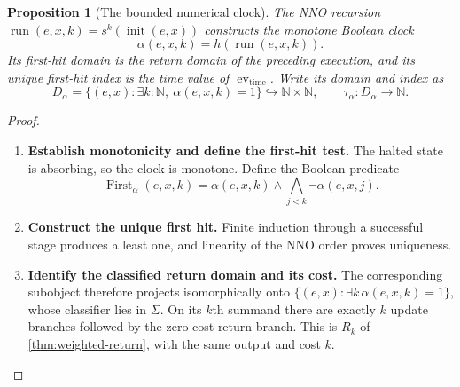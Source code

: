 \documentclass[11pt,a4paper]{article}
\numberwithin{algorithm}{section}
\numberwithin{equation}{section}
\newtheorem{proposition}[proposition]{Proposition}
\theoremstyle{definition}
\theoremstyle{remark}
\theoremstyle{plain}
\newcommand{\N}{\mathbb N}
\newcommand{\incl}{\hookrightarrow}
\theoremstyle{definition}
\theoremstyle{plain}
\begin{document}
\begin{proposition}[The bounded numerical clock]\label{prop:numerical-clock}
The NNO recursion $\operatorname{run}(e,x,k)=s^k(\operatorname{init}(e,x))$
constructs the monotone Boolean clock
\[
 \alpha(e,x,k)=h(\operatorname{run}(e,x,k)).
\]
Its first-hit domain is the return domain of the preceding execution,
and its unique first-hit index is the time value of
$\operatorname{ev}_{\mathrm{time}}$. Write its domain and index as
\[
 D_\alpha=\{(e,x):\exists k:\N,\ \alpha(e,x,k)=1\}\incl\N\times\N,
 \qquad\tau_\alpha:D_\alpha\to\N.
\]
\end{proposition}
\begin{proof}\leavevmode
\begin{enumerate}[leftmargin=*,align=left]
\item \textbf{Establish monotonicity and define the first-hit test.}
The halted state is absorbing, so the clock is monotone. Define the
Boolean predicate
\[
 \operatorname{First}_\alpha(e,x,k)=
 \alpha(e,x,k)\wedge\bigwedge_{j<k}\neg\alpha(e,x,j).
\]

\item \textbf{Construct the unique first hit.}
Finite induction through a successful stage produces a least one, and
linearity of the NNO order proves uniqueness.

\item \textbf{Identify the classified return domain and its cost.}
The corresponding
subobject therefore projects isomorphically onto
$\{(e,x):\exists k\,\alpha(e,x,k)=1\}$, whose classifier lies in
$\Sigma$. On its $k$th summand there are exactly $k$ update branches
followed by the zero-cost return branch. This is $R_k$ of
\cref{thm:weighted-return}, with the same output and cost $k$.
\end{enumerate}
\end{proof}
\end{document}
